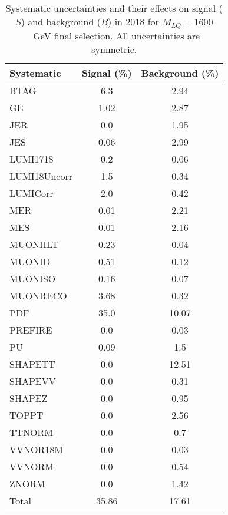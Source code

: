 \begin{table}[htbp]
\begin{center}
\caption{Systematic uncertainties and their effects on signal ($S$) and background ($B$) in 2018 for $M_{LQ}=1600$~GeV final selection. All uncertainties are symmetric.}
\begin{tabular}{lcc}
\hline\hline
Systematic & Signal (\%) & Background (\%) \\ \hline 
BTAG & 6.3 & 2.94\\ 
GE & 1.02 & 2.87\\ 
JER & 0.0 & 1.95\\ 
JES & 0.06 & 2.99\\ 
LUMI1718 & 0.2 & 0.06\\ 
LUMI18Uncorr & 1.5 & 0.34\\ 
LUMICorr & 2.0 & 0.42\\ 
MER & 0.01 & 2.21\\ 
MES & 0.01 & 2.16\\ 
MUONHLT & 0.23 & 0.04\\ 
MUONID & 0.51 & 0.12\\ 
MUONISO & 0.16 & 0.07\\ 
MUONRECO & 3.68 & 0.32\\ 
PDF & 35.0 & 10.07\\ 
PREFIRE & 0.0 & 0.03\\ 
PU & 0.09 & 1.5\\ 
SHAPETT & 0.0 & 12.51\\ 
SHAPEVV & 0.0 & 0.31\\ 
SHAPEZ & 0.0 & 0.95\\ 
TOPPT & 0.0 & 2.56\\ 
TTNORM & 0.0 & 0.7\\ 
VVNOR18M & 0.0 & 0.03\\ 
VVNORM & 0.0 & 0.54\\ 
ZNORM & 0.0 & 1.42\\ 
Total & 35.86 & 17.61\\ \hline \hline
\end{tabular}
\label{tab:SysUncertainties_uujj_1600}
\end{center}
\end{table}

